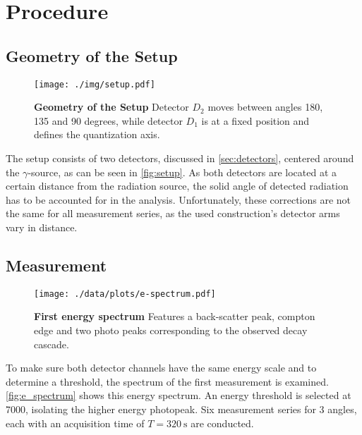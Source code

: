 \chapter{Procedure}

\section{Geometry of the Setup}
\begin{figure}[tbp]
	\centering
	\texttt{[image: ./img/setup.pdf]}
	\caption[Geometry of the Setup]{\textbf{Geometry of the Setup} Detector $D_2$ moves between angles 180, 135 and 90 degrees, while detector $D_1$ is at a fixed position and defines the quantization axis.}
	\label{fig:setup}
\end{figure}
The setup consists of two detectors, discussed in \autoref{sec:detectors}, centered around the $\gamma$-source, as can be seen in \autoref{fig:setup}.
As both detectors are located at a certain distance from the radiation source, the solid angle of detected radiation has to be accounted for in the analysis.
Unfortunately, these corrections are not the same for all measurement series, as the used construction's detector arms vary in distance.

\section{Measurement}
\begin{figure}[tbp]
	\centering
	\texttt{[image: ./data/plots/e-spectrum.pdf]}
	\caption[First energy spectrum]{\textbf{First energy spectrum} Features a back-scatter peak, compton edge and two photo peaks corresponding to the observed decay cascade.}
	\label{fig:e_spectrum}
\end{figure}
To make sure both detector channels have the same energy scale and to determine a threshold, the spectrum of the first measurement is examined.
\autoref{fig:e_spectrum} shows this energy spectrum.
An energy threshold is selected at 7000, isolating the higher energy photopeak.
Six measurement series for 3 angles, each with an acquisition time of $T=\SI{320}{\second}$ are conducted.
